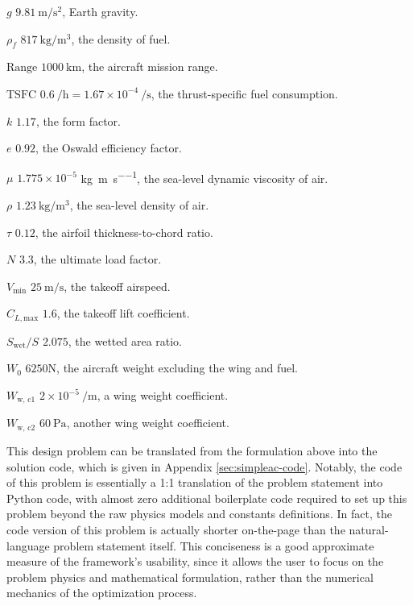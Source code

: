 \begin{example}
    \begin{eqexpl}
        \item {$g$} $9.81\ \si{\meter/\second\squared}$, Earth gravity.
        \item {$\rho_f$} $817\ \si{\kg/\meter\cubed}$, the density of fuel.
        \item {$\text{Range}$} $1000\ \si{\kilo\meter}$, the aircraft mission range.
        \item {$\text{TSFC}$} $0.6\ \si{\per\hour} = 1.67 \times 10^{-4}\ \si{\per\second}$, the thrust-specific fuel consumption.
        \item {$k$} $1.17$, the form factor.
        \item {$e$} $0.92$, the Oswald efficiency factor.
        \item {$\mu$} $1.775 \times 10^{-5}$ \si{\kg\per\meter\per\second}, the sea-level dynamic viscosity of air.
        \item {$\rho$} $1.23\ \si{\kg/\meter\cubed}$, the sea-level density of air.
        \item {$\tau$} $0.12$, the airfoil thickness-to-chord ratio.
        \item {$N$} $3.3$, the ultimate load factor.
        \item {$V_\text{min}$} $25\ \si{\meter/\second}$, the takeoff airspeed.
        \item {$C_{L, \text{max}}$} $1.6$, the takeoff lift coefficient.
        \item {$S_\text{wet}/S$} $2.075$, the wetted area ratio.
        \item {$W_0$} $6250 \si{\newton}$, the aircraft weight excluding the wing and fuel.
        \item {$W_\text{w, c1}$} $2 \times 10^{-5}\ \si{\per\meter}$, a wing weight coefficient.
        \item {$W_\text{w, c2}$} $60\ \si{\Pa}$, another wing weight coefficient.
    \end{eqexpl}

\end{example}

This design problem can be translated from the formulation above into the solution code, which is given in Appendix \ref{sec:simpleac-code}. Notably, the code of this problem is essentially a 1:1 translation of the problem statement into Python code, with almost zero additional boilerplate code required to set up this problem beyond the raw physics models and constants definitions. In fact, the code version of this problem is actually shorter on-the-page than the natural-language problem statement itself. This conciseness is a good approximate measure of the framework's usability, since it allows the user to focus on the problem physics and mathematical formulation, rather than the numerical mechanics of the optimization process.

